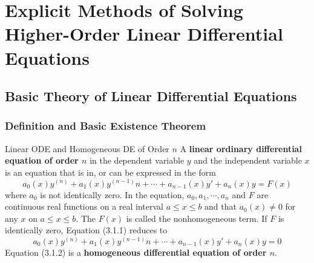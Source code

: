 
\section{Explicit Methods of Solving Higher-Order Linear Differential Equations}


\subsection{Basic Theory of Linear Differential Equations}


\subsubsection{Definition and Basic Existence Theorem}

\begin{definition}{Linear ODE and Homogeneous DE of Order $n$}{}
    A \textbf{linear ordinary differential equation of order $n$} in the dependent variable $y$ and the independent variable $x$ is an equation that is in, or can be expressed in the form
    \begin{equation}
        a_0(x)y^{(n)} + a_1(x)y^{(n-1)}n + \cdots + a_{n-1}(x)y' + a_n(x)y = F(x)
    \end{equation}
    where $a_0$ is not identically zero. In the equation, $a_0, a_1, \cdots, a_n$ and $F$ are continuous real functions on a real interval $a \le x \le b$ and that $a_0(x) \neq 0$ for any $x$ on $a \le x \le b$. The $F(x)$ is called the nonhomogeneous term. If $F$ is identically zero, Equation (3.1.1) reduces to
    \begin{equation}
        a_0(x)y^{(n)} + a_1(x)y^{(n-1)}n + \cdots + a_{n-1}(x)y' + a_n(x)y = 0
    \end{equation}
    Equation (3.1.2) is a \textbf{homogeneous differential equation of order $n$}.
\end{definition}

